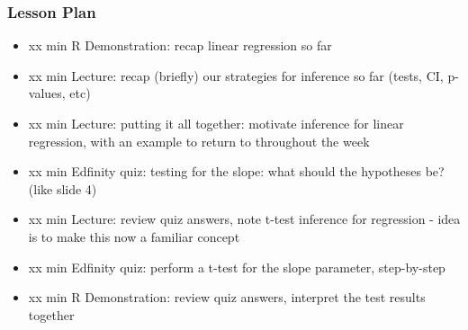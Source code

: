 \begin{frame}
    \frametitle{Lesson Plan}
    \begin{itemize}
        \item xx min R Demonstration: recap linear regression so far
        \item xx min Lecture: recap (briefly) our strategies for inference so far (tests, CI, p-values, etc)
        \item xx min Lecture: putting it all together: motivate inference for linear regression, with an example to return to throughout the week
        \item xx min Edfinity quiz: testing for the slope: what should the hypotheses be? (like slide 4)
        \item xx min Lecture: review quiz answers, note t-test inference for regression - idea is to make this now a familiar concept
        \item xx min Edfinity quiz: perform a t-test for the slope parameter, step-by-step
        \item xx min R Demonstration: review quiz answers, interpret the test results together
    \end{itemize}
\end{frame}

